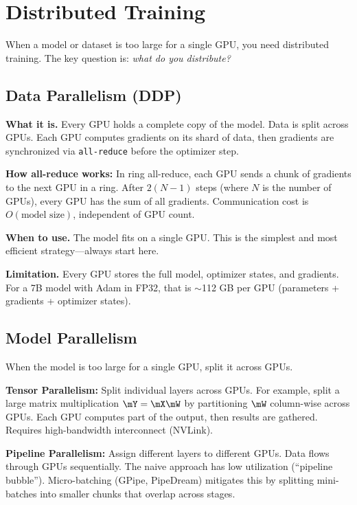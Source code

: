 \section{Distributed Training}
\label{sec:distributed}

When a model or dataset is too large for a single GPU, you need distributed training. The key question is: \textit{what do you distribute?}

\subsection{Data Parallelism (DDP)}

\textbf{What it is.} Every GPU holds a complete copy of the model. Data is split across GPUs. Each GPU computes gradients on its shard of data, then gradients are synchronized via \texttt{all-reduce} before the optimizer step.

\textbf{How all-reduce works:} In ring all-reduce, each GPU sends a chunk of gradients to the next GPU in a ring. After $2(N-1)$ steps (where $N$ is the number of GPUs), every GPU has the sum of all gradients. Communication cost is $O(\text{model size})$, independent of GPU count.

\textbf{When to use.} The model fits on a single GPU. This is the simplest and most efficient strategy---always start here.

\textbf{Limitation.} Every GPU stores the full model, optimizer states, and gradients. For a 7B model with Adam in FP32, that is $\sim$112 GB per GPU (parameters + gradients + optimizer states).

\subsection{Model Parallelism}

When the model is too large for a single GPU, split it across GPUs.

\textbf{Tensor Parallelism:} Split individual layers across GPUs. For example, split a large matrix multiplication $\mY = \mX\mW$ by partitioning $\mW$ column-wise across GPUs. Each GPU computes part of the output, then results are gathered. Requires high-bandwidth interconnect (NVLink).

\textbf{Pipeline Parallelism:} Assign different layers to different GPUs. Data flows through GPUs sequentially. The naive approach has low utilization (``pipeline bubble''). Micro-batching (GPipe, PipeDream) mitigates this by splitting mini-batches into smaller chunks that overlap across stages.

